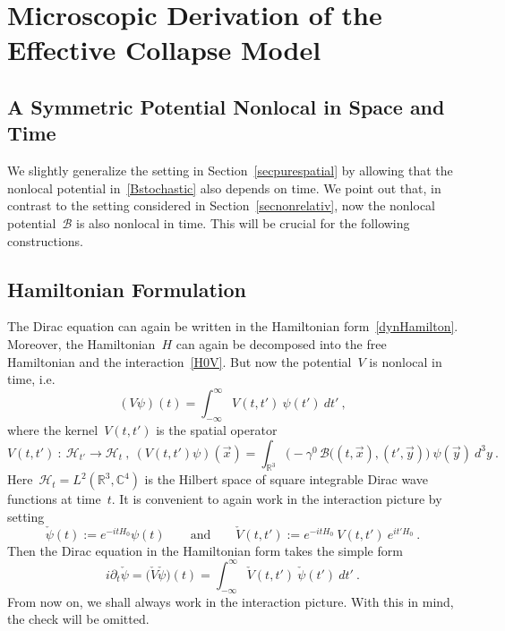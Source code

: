 \documentclass[reqno,11pt]{amsart}
\numberwithin{equation}{section}
\newcommand{\beq}{\begin{equation}}
\newcommand{\eeq}{\end{equation}}
\newcommand{\C}{\mathbb{C}}
\newcommand{\R}{\mathbb{R}}
\newcommand{\1}{\mathds{1}}
\newcommand{\B}{{\mathscr{B}}}
\renewcommand{\H}{\mathscr{H}}
\begin{document}
\section{Microscopic Derivation of the Effective Collapse Model} \label{secmodel}
\subsection{A Symmetric Potential Nonlocal in Space and Time} \label{secnonloc}
We slightly generalize the setting in Section~\ref{secpurespatial} by allowing that the
nonlocal potential in~\eqref{Bstochastic} also depends on time.
We point out that, in contrast to the setting considered in Section~\ref{secnonrelativ}, now the
nonlocal potential~$\B$ is also nonlocal in time. This will be crucial for the following constructions.

\subsection{Hamiltonian Formulation} \label{sechamilton}
The Dirac equation can again be written in the Hamiltonian form~\eqref{dynHamilton}.
Moreover, the Hamiltonian~$H$ can again be decomposed into the free Hamiltonian and the
interaction~\eqref{H0V}. But now the potential~$V$ is nonlocal in time, i.e.\
\[ (V \psi)(t) = \int_{-\infty}^\infty V(t,t')\: \psi(t')\: dt' \:, \]
where the kernel~$V(t,t')$ is the spatial operator
\beq \label{Vdef2}
V(t,t') \::\: \H_{t'} \rightarrow \H_{t} \:,\:
(V(t,t') \psi)(\vec{x}) = \int_{\R^3} \Big(- \gamma^0 \, \B\big( (t,\vec{x}), (t', \vec{y}) \Big) \: \psi(\vec{y})\: d^3y \:.
\eeq
Here~$\H_t = L^2(\R^3, \C^4)$ is the Hilbert space of square integrable Dirac wave functions at time~$t$.
It is convenient to again work in the interaction picture by setting
\[ \check{\psi}(t) := e^{-i t H_0} \psi(t) \qquad \text{and} \qquad
\check{V}(t,t') := e^{-i t H_0}\: V(t,t')\: e^{i t' H_0} \:. \]
Then the Dirac equation in the Hamiltonian form takes the simple form
\beq \label{Hint}
i \partial_t \check{\psi} = \big( \check{V} \check{\psi} \big)(t) = \int_{-\infty}^\infty \check{V}(t,t')\: \check{\psi}(t')\: dt' \:.
\eeq
From now on, we shall always work in the interaction picture. With this in mind, the check will be omitted.
\end{document}
